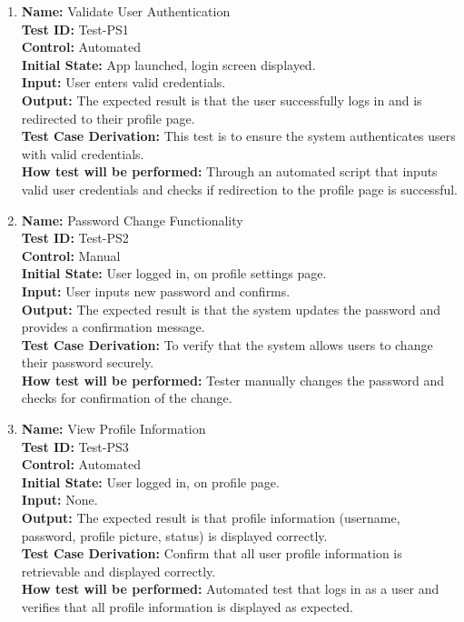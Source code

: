 \documentclass[12pt, titlepage]{article}
\begin{document}
\begin{enumerate}
  \item \textbf{Name:} {Validate User Authentication} \label{itm:Test-PS1}\\
        \textbf{Test ID:} Test-PS1\\
        \textbf{Control:} Automated \\
        \textbf{Initial State:} App launched, login screen displayed. \\
        \textbf{Input:} User enters valid credentials. \\
        \textbf{Output:} The expected result is that the user successfully logs in and is redirected to their profile page. \\
        \textbf{Test Case Derivation:} This test is to ensure the system authenticates users with valid credentials.\\
        \textbf{How test will be performed:} Through an automated script that inputs valid user credentials and checks if redirection to the profile page is successful.

  \item \textbf{Name:} {Password Change Functionality} \label{itm:Test-PS2}\\
        \textbf{Test ID:} Test-PS2\\
        \textbf{Control:} Manual \\
        \textbf{Initial State:} User logged in, on profile settings page. \\
        \textbf{Input:} User inputs new password and confirms. \\
        \textbf{Output:} The expected result is that the system updates the password and provides a confirmation message. \\
        \textbf{Test Case Derivation:} To verify that the system allows users to change their password securely. \\
        \textbf{How test will be performed:} Tester manually changes the password and checks for confirmation of the change.

  \item \textbf{Name:} {View Profile Information} \label{itm:Test-PS3}\\
        \textbf{Test ID:} Test-PS3\\
        \textbf{Control:} Automated \\
        \textbf{Initial State:} User logged in, on profile page. \\
        \textbf{Input:} None. \\
        \textbf{Output:} The expected result is that profile information (username, password, profile picture, status) is displayed correctly. \\
        \textbf{Test Case Derivation:} Confirm that all user profile information is retrievable and displayed correctly. \\
        \textbf{How test will be performed:} Automated test that logs in as a user and verifies that all profile information is displayed as expected.


\end{enumerate}
\end{document}
